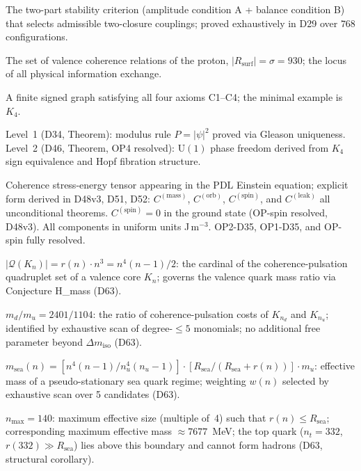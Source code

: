 \documentclass[11pt,a4paper]{article}
\theoremstyle{plain}
\theoremstyle{definition}
\theoremstyle{remark}
\newcommand{\Rsurf}{R_{\mathrm{surf}}}
\newcommand{\Ccoh}{C_{\mathrm{coh}}}
\begin{document}
\begin{description}[leftmargin=3.5cm, style=nextline]
\item[AB criterion] The two-part stability criterion (amplitude condition A + balance condition B) that selects admissible two-closure couplings; proved exhaustively in D29 over $768$ configurations.
\item[Active surface $\Rsurf$] The set of valence coherence relations of the proton, $|\Rsurf|=\sigma=930$; the locus of all physical information exchange.
\item[Admissible closure] A finite signed graph satisfying all four axioms C1--C4; the minimal example is $K_4$.
\item[Born Level~1 / Level~2] Level~1 (D34, Theorem): modulus rule $P=|\psi|^2$ proved via Gleason uniqueness. Level~2 (D46, Theorem, OP4 resolved): $\mathrm{U}(1)$ phase freedom derived from $K_4$ sign equivalence and Hopf fibration structure.
\item[$\Ccoh$] Coherence stress-energy tensor appearing in the PDL Einstein equation; explicit form derived in D48v3, D51, D52: $C^{(\mathrm{mass})}$, $C^{(\mathrm{orb})}$, $C^{(\mathrm{spin})}$, and $C^{(\mathrm{leak})}$ all unconditional theorems. $C^{(\mathrm{spin})}=0$ in the ground state (OP-spin resolved, D48v3). All components in uniform units J\,m$^{-3}$. OP2-D35, OP1-D35, and OP-spin fully resolved. 
\item[Coherence-pulsation cost] $|\mathcal{Q}(K_n)| = r(n)\cdot n^3 = n^4(n-1)/2$: the cardinal of the coherence-pulsation quadruplet set of a valence core $K_n$; governs the valence quark mass ratio via Conjecture H\_mass (D63).
\item[Conjecture H\_mass] $m_d/m_u = 2401/1104$: the ratio of coherence-pulsation costs of $K_{n_d}$ and $K_{n_u}$; identified by exhaustive scan of degree-$\leq 5$ monomials; no additional free parameter beyond $\Delta m_{\mathrm{iso}}$ (D63).
\item[Conjecture H\_sea] $m_{\mathrm{sea}}(n) = [n^4(n-1)/n_u^4(n_u-1)]\cdot[R_{\mathrm{sea}}/(R_{\mathrm{sea}}+r(n))]\cdot m_u$: effective mass of a pseudo-stationary sea quark regime; weighting $w(n)$ selected by exhaustive scan over 5 candidates (D63).
\item[Hadronisation boundary] $n_{\max} = 140$: maximum effective size (multiple of~4) such that $r(n) \leq R_{\mathrm{sea}}$; corresponding maximum effective mass $\approx 7677$~MeV; the top quark ($n_t = 332$, $r(332) \gg R_{\mathrm{sea}}$) lies above this boundary and cannot form hadrons (D63, structural corollary).

\end{description}
\end{document}

